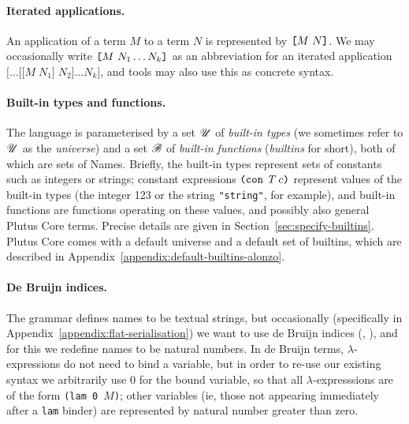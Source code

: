 \paragraph{Iterated applications.}
An application of a term $M$ to a term $N$ is represented by
$\texttt{[} M ~ N \texttt{]}$.   We may occasionally write $\texttt{[} M ~ N_1
  \ldots N_k \texttt{]}$ as an abbreviation for an iterated application
$\mathtt{[}\ldots\mathtt{[[}M\;N_1\mathtt{]}\;N_2\mathtt{]}\ldots
  N_k\mathtt{]}$, and tools may also use this as concrete syntax.

\paragraph{Built-in types and functions.} The language is parameterised by a set $\mathscr{U}$ of
\textit{built-in types} (we sometimes refer to $\mathscr{U}$ as the
\textit{universe}) and a set $\mathscr{B}$ of \textit{built-in functions}
(\textit{builtins} for short), both of which are sets of Names.
Briefly, the built-in types represent sets of constants such as
integers or strings; constant expressions $\texttt{(} \texttt{con} ~ \textit{T} ~ c \texttt{)}$ represent
values of the built-in types (the integer 123 or the string
\texttt{"string"}, for example), and built-in functions are functions
operating on these values, and possibly also general Plutus Core
terms.  Precise details are given in
Section~\ref{sec:specify-builtins}.  Plutus Core comes with a default
universe and a default set of builtins, which are described in
Appendix~\ref{appendix:default-builtins-alonzo}.%

\paragraph{De Bruijn indices.}
The grammar defines names to be textual strings, but occasionally (specifically
in Appendix~\ref{appendix:flat-serialisation}) we want to use de Bruijn indices
(\cite{deBruijn}, \cite[C.3]{Barendregt}), and for this we redefine names to be
natural numbers.  In de Bruijn terms, $\lambda$-expressions do not need to bind
a variable, but in order to re-use our existing syntax we arbitrarily use 0 for
the bound variable, so that all $\lambda$-expresssions are of the form
\texttt{(lam 0 $M$)}; other variables (ie, those not appearing immediately after
a \texttt{lam} binder) are represented by natural number greater than zero.
